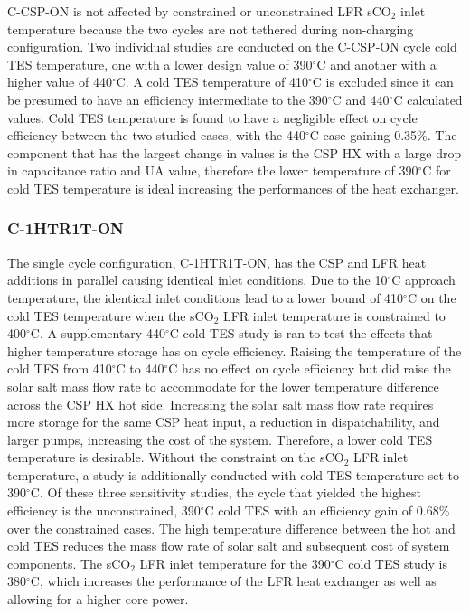\begin{paracol}{2}
C-CSP-ON is not affected by constrained or unconstrained LFR sCO$_2$ inlet temperature because the two cycles are not tethered during non-charging configuration. Two individual studies are conducted on the C-CSP-ON cycle cold TES temperature, one with a lower design value of 390$^{\circ}$C and another with a higher value of 440$^{\circ}$C. A cold TES temperature of 410$^{\circ}$C is excluded since it can be presumed to have an efficiency intermediate to the 390$^{\circ}$C and 440$^{\circ}$C calculated values. Cold TES temperature is found to have a negligible effect on cycle efficiency between the two studied cases, with the 440$^{\circ}$C case gaining 0.35\%. The component that has the largest change in values is the CSP HX with a large drop in capacitance ratio and UA value, therefore the lower temperature of 390$^{\circ}$C for cold TES temperature is ideal increasing the performances of the heat exchanger. 


\subsubsection{C-1HTR1T-ON}
The single cycle configuration, C-1HTR1T-ON, has the CSP and LFR heat additions in parallel causing identical inlet conditions. Due to the 10$^{\circ}$C approach temperature, the identical inlet conditions lead to a lower bound of 410$^{\circ}$C on the cold TES temperature when the sCO$_2$ LFR inlet temperature is constrained to 400$^{\circ}$C. A supplementary 440$^{\circ}$C cold TES study is ran to test the effects that higher temperature storage has on cycle efficiency. Raising the temperature of the cold TES from 410$^{\circ}$C to 440$^{\circ}$C has no effect on cycle efficiency but did raise the solar salt mass flow rate to accommodate for the lower temperature difference across the CSP HX hot side. Increasing the solar salt mass flow rate requires more storage for the same CSP heat input, a reduction in dispatchability, and larger pumps, increasing the cost of the system. Therefore, a lower cold TES temperature is desirable. Without the constraint on the sCO$_2$ LFR inlet temperature, a study is additionally conducted with cold TES temperature set to 390$^{\circ}$C. Of these three sensitivity studies, the cycle that yielded the highest efficiency is the unconstrained, 390$^{\circ}$C cold TES with an efficiency gain of 0.68\% over the constrained cases. The high temperature difference between the hot and cold TES reduces the mass flow rate of solar salt and subsequent cost of system components. The sCO$_2$ LFR inlet temperature for the 390$^{\circ}$C cold TES study is 380$^{\circ}$C, which increases the performance of the LFR heat exchanger as well as allowing for a higher core power. 


\end{paracol}

